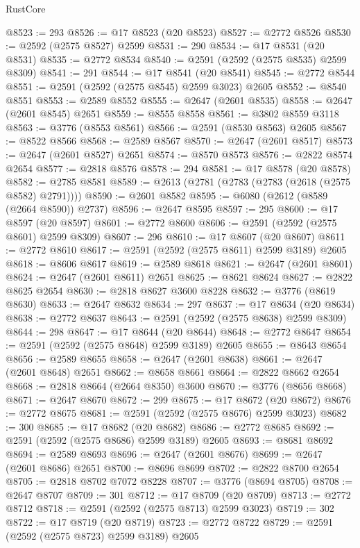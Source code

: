 \begin{lexlean}{RustCore}
\begin{coremodule}
@8523 := 293
@8526 := @17 @8523 (@20 @8523)
@8527 := @2772 @8526
@8530 := @2592 (@2575 @8527) @2599
@8531 := 290
@8534 := @17 @8531 (@20 @8531)
@8535 := @2772 @8534
@8540 := @2591 (@2592 (@2575 @8535) @2599 @8309)
@8541 := 291
@8544 := @17 @8541 (@20 @8541)
@8545 := @2772 @8544
@8551 := @2591 (@2592 (@2575 @8545) @2599 @3023) @2605
@8552 := @8540 @8551
@8553 := @2589 @8552
@8555 := @2647 (@2601 @8535)
@8558 := @2647 (@2601 @8545) @2651
@8559 := @8555 @8558
@8561 := @3802 @8559 @3118
@8563 := @3776 (@8553 @8561)
@8566 := @2591 (@8530 @8563) @2605
@8567 := @8522 @8566
@8568 := @2589 @8567
@8570 := @2647 (@2601 @8517)
@8573 := @2647 (@2601 @8527) @2651
@8574 := @8570 @8573
@8576 := @2822 @8574 @2654
@8577 := @2818 @8576
@8578 := 294
@8581 := @17 @8578 (@20 @8578)
@8582 := @2785 @8581
@8589 := @2613 (@2781 (@2783 (@2783 (@2618 (@2575 @8582) @2791))))
@8590 := @2601 @8582
@8595 := @6080 (@2612 (@8589 (@2664 @8590)) @2737)
@8596 := @2647 @8595
@8597 := 295
@8600 := @17 @8597 (@20 @8597)
@8601 := @2772 @8600
@8606 := @2591 (@2592 (@2575 @8601) @2599 @8309)
@8607 := 296
@8610 := @17 @8607 (@20 @8607)
@8611 := @2772 @8610
@8617 := @2591 (@2592 (@2575 @8611) @2599 @3189) @2605
@8618 := @8606 @8617
@8619 := @2589 @8618
@8621 := @2647 (@2601 @8601)
@8624 := @2647 (@2601 @8611) @2651
@8625 := @8621 @8624
@8627 := @2822 @8625 @2654
@8630 := @2818 @8627 @3600 @8228
@8632 := @3776 (@8619 @8630)
@8633 := @2647 @8632
@8634 := 297
@8637 := @17 @8634 (@20 @8634)
@8638 := @2772 @8637
@8643 := @2591 (@2592 (@2575 @8638) @2599 @8309)
@8644 := 298
@8647 := @17 @8644 (@20 @8644)
@8648 := @2772 @8647
@8654 := @2591 (@2592 (@2575 @8648) @2599 @3189) @2605
@8655 := @8643 @8654
@8656 := @2589 @8655
@8658 := @2647 (@2601 @8638)
@8661 := @2647 (@2601 @8648) @2651
@8662 := @8658 @8661
@8664 := @2822 @8662 @2654
@8668 := @2818 @8664 (@2664 @8350) @3600
@8670 := @3776 (@8656 @8668)
@8671 := @2647 @8670
@8672 := 299
@8675 := @17 @8672 (@20 @8672)
@8676 := @2772 @8675
@8681 := @2591 (@2592 (@2575 @8676) @2599 @3023)
@8682 := 300
@8685 := @17 @8682 (@20 @8682)
@8686 := @2772 @8685
@8692 := @2591 (@2592 (@2575 @8686) @2599 @3189) @2605
@8693 := @8681 @8692
@8694 := @2589 @8693
@8696 := @2647 (@2601 @8676)
@8699 := @2647 (@2601 @8686) @2651
@8700 := @8696 @8699
@8702 := @2822 @8700 @2654
@8705 := @2818 @8702 @7072 @8228
@8707 := @3776 (@8694 @8705)
@8708 := @2647 @8707
@8709 := 301
@8712 := @17 @8709 (@20 @8709)
@8713 := @2772 @8712
@8718 := @2591 (@2592 (@2575 @8713) @2599 @3023)
@8719 := 302
@8722 := @17 @8719 (@20 @8719)
@8723 := @2772 @8722
@8729 := @2591 (@2592 (@2575 @8723) @2599 @3189) @2605

\end{coremodule}
\end{lexlean}
